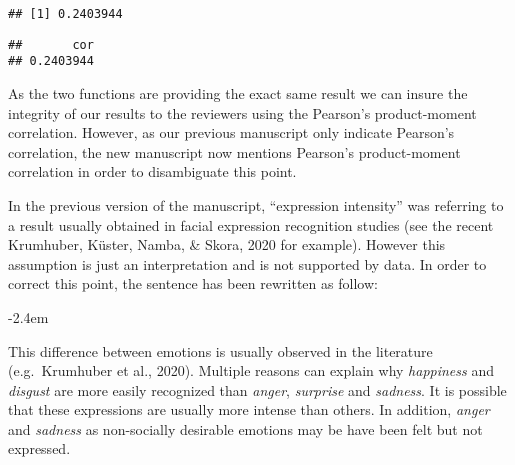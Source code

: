 \documentclass[]{article}
\newenvironment{Shaded}{\begin{snugshade}}{\end{snugshade}}
\newcommand{\DataTypeTok}[1]{\textcolor[rgb]{0.13,0.29,0.53}{#1}}
\newcommand{\KeywordTok}[1]{\textcolor[rgb]{0.13,0.29,0.53}{\textbf{#1}}}
\newcommand{\NormalTok}[1]{#1}
\newcommand{\OperatorTok}[1]{\textcolor[rgb]{0.81,0.36,0.00}{\textbf{#1}}}
\newcommand{\StringTok}[1]{\textcolor[rgb]{0.31,0.60,0.02}{#1}}
\renewenvironment{quote}{\begin{fquote}\advance\leftmargini -2.4em\begin{oldquote}}{\end{oldquote}\end{fquote}}
\newenvironment{fquote}
  {\def\FrameCommand{
	\fboxsep=0.6em %
	\fcolorbox{black}{white}}%
    \MakeFramed {\advance\hsize-2\width \FrameRestore}
    \begin{minipage}{\linewidth}
  }
  {\end{minipage}\endMakeFramed}
\begin{document}
\begin{verbatim}
## [1] 0.2403944
\end{verbatim}

\begin{Shaded}
\end{Shaded}

\begin{verbatim}
##       cor 
## 0.2403944
\end{verbatim}

As the two functions are providing the exact same result we can insure the integrity of our results to the reviewers using the Pearson's product-moment correlation. However, as our previous manuscript only indicate Pearson's correlation, the new manuscript now mentions Pearson's product-moment correlation in order to disambiguate this point.


In the previous version of the manuscript, ``expression intensity'' was referring to a result usually obtained in facial expression recognition studies (see the recent Krumhuber, Küster, Namba, \& Skora, 2020 for example). However this assumption is just an interpretation and is not supported by data. In order to correct this point, the sentence has been rewritten as follow:

\begin{quote}
This difference between emotions is usually observed in the literature (e.g.~Krumhuber et al., 2020). Multiple reasons can explain why \emph{happiness} and \emph{disgust} are more easily recognized than \emph{anger}, \emph{surprise} and \emph{sadness}. It is possible that these expressions are usually more intense than others. In addition, \emph{anger} and \emph{sadness} as non-socially desirable emotions may be have been felt but not expressed.
\end{quote}

\end{document}
